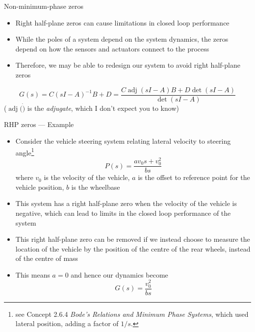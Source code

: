 \documentclass[10pt]{beamer-control}
\begin{document}

\begin{frame}{Non-minimum-phase zeros}
  \begin{itemize}
    \item Right half-plane zeros can cause limitations in closed loop performance
    \item While the poles of a system depend on the system dynamics, the zeros depend on how the sensors and actuators connect to the process
    \item Therefore, we may be able to redesign our system to avoid right half-plane zeros
  \end{itemize}
  \begin{equation}
    G(s) = C(sI-A)^{-1} B + D = \frac{C \operatorname{adj}(sI-A) B + D \operatorname{det}(sI-A) }{\operatorname{det}(sI-A)}
  \end{equation}
  ($\operatorname{adj}(\dot)$ is the \emph{adjugate}, which I don't expect you to know)
\end{frame}

\begin{frame}{RHP zeros --- Example}
	\begin{itemize}
		\item Consider the vehicle steering system relating lateral velocity to steering angle\footnote{see Concept 2.6.4 \emph{Bode's Relations and Minimum Phase Systems}, which used lateral position, adding a factor of $1/s$.}
      \begin{equation}
        P(s) = \frac{av_0s+v_0^2}{bs}
      \end{equation}
      where $v_0$ is the velocity of the vehicle, $a$ is the offset to reference point for the vehicle position, $b$ is the wheelbase
    \item This system has a right half-plane zero when the velocity of the vehicle is negative, which can lead to limits in the closed loop performance of the system
    \item This right half-plane zero can be removed if we instead choose to measure the location of the vehicle by the position of the centre of the rear wheels, instead of the centre of mass
    \item This means $a=0$ and hence our dynamics become
      \begin{equation}
        G(s) = \frac{v_0^2}{bs}
      \end{equation}
  \end{itemize}
\end{frame}
\end{document}
